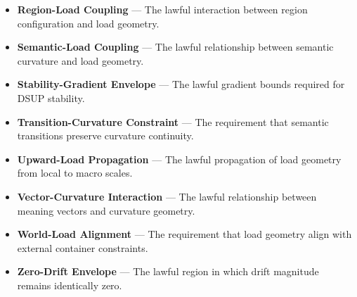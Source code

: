 \begin{itemize}
    \item \textbf{Region-Load Coupling} — The lawful interaction between region configuration and load geometry.

    \item \textbf{Semantic-Load Coupling} — The lawful relationship between semantic curvature and load geometry.

    \item \textbf{Stability-Gradient Envelope} — The lawful gradient bounds required for DSUP stability.

    \item \textbf{Transition-Curvature Constraint} — The requirement that semantic transitions preserve curvature continuity.

    \item \textbf{Upward-Load Propagation} — The lawful propagation of load geometry from local to macro scales.

    \item \textbf{Vector-Curvature Interaction} — The lawful relationship between meaning vectors and curvature geometry.

    \item \textbf{World-Load Alignment} — The requirement that load geometry align with external container constraints.

    \item \textbf{Zero-Drift Envelope} — The lawful region in which drift magnitude remains identically zero.

\end{itemize}
